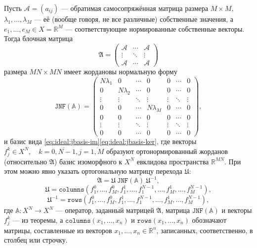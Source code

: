  \begin{corollary}
     Пусть \( \mathcal{A} = (a_{ij}) \) --- обратимая самосопряжённая матрица размера \( M\times M \),
     \( \lambda_1, \ldots, \lambda_M \) --- её (вообще говоря, не все различные) собственные значения,
     а \( e_1, \ldots, e_M \in X=\mathbb{R}^M \) --- соответствующие нормированные собственные векторы.
     Тогда блочная матрица
     \[ \mathfrak{A} = \begin{pmatrix}
         \mathcal{A} & \cdots & \mathcal{A} \\
         \vdots & \ddots & \vdots \\
         \mathcal{A} & \cdots & \mathcal{A}
     \end{pmatrix} \]
     размера \( MN\times MN \) имеет жордановы нормальную форму
\begin{equation}\label{eq:ideal:jnf}
    \mathtt{JNF}(\mathbb{A}) =
    \left(\begin{array}{cccc|ccc}
            N\lambda_1 & 0  & \cdots & 0 & 0 & \cdots & 0 \\
            0 & N\lambda_2  & \cdots & 0 & 0 & \cdots & 0 \\
            \vdots & \vdots & \ddots & \vdots & \vdots & \ddots & \vdots \\
            0 & 0 & \cdots  & N\lambda_M & 0 & \cdots & 0 \\
            \hline
            0 & 0 & \cdots  & 0 & 0 & \cdots & 0 \\
            \vdots & \vdots & \ddots & \vdots & \vdots & \ddots & \vdots \\
            0 & 0 & \cdots  & 0 & 0 & \cdots & 0
            \end{array}\right),
\end{equation}
     и базис вида \eqref{eq:ideal:jbasis-im}\eqref{eq:ideal:jbasis-ker},
     где векторы \( f_j^k\in X^N,\quad k=\overline{0,N-1},j=\overline{1,M} \)
     образуют ортонормированный жорданов (относительно \( \mathfrak{A} \))
     базис изоморфного к \( X^N \) евклидова пространства \( \mathbb{R}^{MN} \).
     При этом можно явно указать ортогональную матрицу перехода \( \mathfrak{U} \):
     \[
         \mathfrak{A} = \mathfrak{U} ~ \mathtt{JNF}(\mathbb{A}) ~ \mathfrak{U}^{-1}, \]
    \[ \mathfrak{U} = \mathtt{columns}(f_1^0,\ldots,f_M^0,f_1^1,\ldots,f_1^{N-1},\ldots,f_M^1,\ldots,f_M^{N-1}), \]
    \[ \mathfrak{U}^{-1} = \mathtt{rows}(f_1^0,\ldots,f_M^0,f_1^1,\ldots,f_1^{N-1},\ldots,f_M^1,\ldots,f_M^{N-1}), \]
     где \( \mathbb{A}:X^N\to X^N \) --- оператор, заданный матрицей \( \mathfrak{A} \),
     матрица \( \mathtt{JNF(\mathbb{A})} \) и векторы \( f_j^k \) --- из теоремы,
     а \( \mathtt{columns}(x_1,\ldots,x_n) \) и \( \mathtt{rows}(x_1,\ldots,x_n) \) обозначают матрицы,
     составленные из векторов \( x_1, \ldots, x_n \in \mathbb{R}^n \),
     записанных, соответственно, в столбец или строчку.
 \end{corollary}
